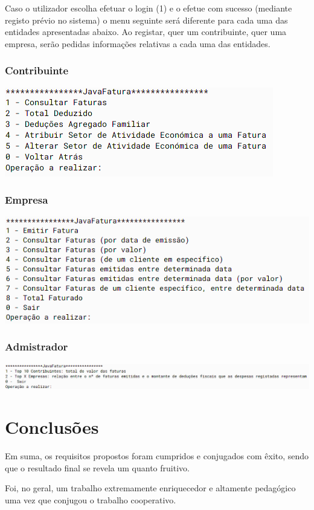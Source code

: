 \documentclass[a4paper]{article}
\begin{document}
Caso o utilizador escolha efetuar o login (1) e o efetue com sucesso (mediante registo prévio no sistema)
o menu seguinte será diferente para cada uma das entidades apresentadas abaixo.
Ao registar, quer um contribuinte, quer uma empresa, serão pedidas informações relativas a cada uma das entidades.


\subsubsection{Contribuinte}

	\includegraphics[width=.7\linewidth]{contribuinte_menu.png}


\subsubsection{Empresa}

	\includegraphics[width=.9\linewidth]{empresa_menu.png}


\subsubsection{Admistrador}

	\includegraphics[width=.9\linewidth]{admin_menu.png}




\section{Conclusões}
\label{sec:conclusao}

Em suma, os requisitos propostos foram cumpridos e conjugados com êxito, sendo que o resultado final se revela um quanto fruitivo. 

Foi, no geral, um trabalho extremamente enriquecedor e altamente pedagógico uma vez que conjugou o trabalho cooperativo.
\end{document}
